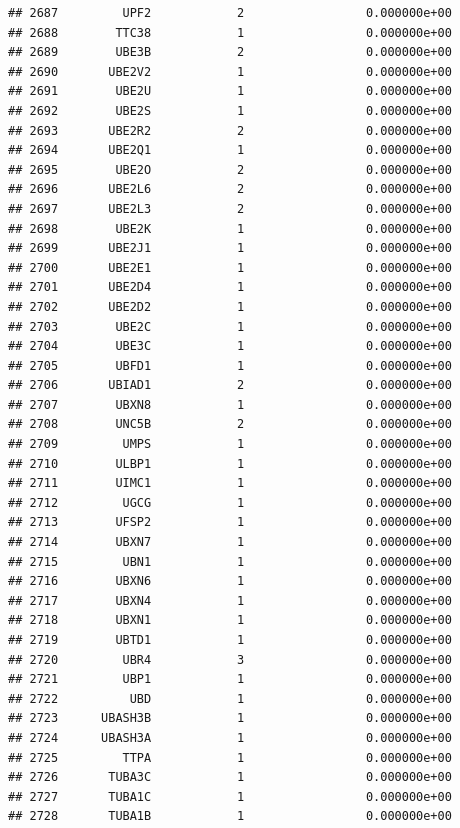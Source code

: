 \documentclass[
]{article}
\begin{document}
\begin{verbatim}
## 2687         UPF2            2                 0.000000e+00
## 2688        TTC38            1                 0.000000e+00
## 2689        UBE3B            2                 0.000000e+00
## 2690       UBE2V2            1                 0.000000e+00
## 2691        UBE2U            1                 0.000000e+00
## 2692        UBE2S            1                 0.000000e+00
## 2693       UBE2R2            2                 0.000000e+00
## 2694       UBE2Q1            1                 0.000000e+00
## 2695        UBE2O            2                 0.000000e+00
## 2696       UBE2L6            2                 0.000000e+00
## 2697       UBE2L3            2                 0.000000e+00
## 2698        UBE2K            1                 0.000000e+00
## 2699       UBE2J1            1                 0.000000e+00
## 2700       UBE2E1            1                 0.000000e+00
## 2701       UBE2D4            1                 0.000000e+00
## 2702       UBE2D2            1                 0.000000e+00
## 2703        UBE2C            1                 0.000000e+00
## 2704        UBE3C            1                 0.000000e+00
## 2705        UBFD1            1                 0.000000e+00
## 2706       UBIAD1            2                 0.000000e+00
## 2707        UBXN8            1                 0.000000e+00
## 2708        UNC5B            2                 0.000000e+00
## 2709         UMPS            1                 0.000000e+00
## 2710        ULBP1            1                 0.000000e+00
## 2711        UIMC1            1                 0.000000e+00
## 2712         UGCG            1                 0.000000e+00
## 2713        UFSP2            1                 0.000000e+00
## 2714        UBXN7            1                 0.000000e+00
## 2715         UBN1            1                 0.000000e+00
## 2716        UBXN6            1                 0.000000e+00
## 2717        UBXN4            1                 0.000000e+00
## 2718        UBXN1            1                 0.000000e+00
## 2719        UBTD1            1                 0.000000e+00
## 2720         UBR4            3                 0.000000e+00
## 2721         UBP1            1                 0.000000e+00
## 2722          UBD            1                 0.000000e+00
## 2723      UBASH3B            1                 0.000000e+00
## 2724      UBASH3A            1                 0.000000e+00
## 2725         TTPA            1                 0.000000e+00
## 2726       TUBA3C            1                 0.000000e+00
## 2727       TUBA1C            1                 0.000000e+00
## 2728       TUBA1B            1                 0.000000e+00

\end{verbatim}
\end{document}
